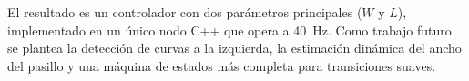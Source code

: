 \documentclass[12pt]{article}
\begin{document}
El resultado es un controlador con dos par\'{a}metros principales ($W$ y $L$), implementado en un \'{u}nico nodo C++ que opera a 40~Hz. Como trabajo futuro se plantea la detecci\'{o}n de curvas a la izquierda, la estimaci\'{o}n din\'{a}mica del ancho del pasillo y una m\'{a}quina de estados m\'{a}s completa para transiciones suaves.
\end{document}

